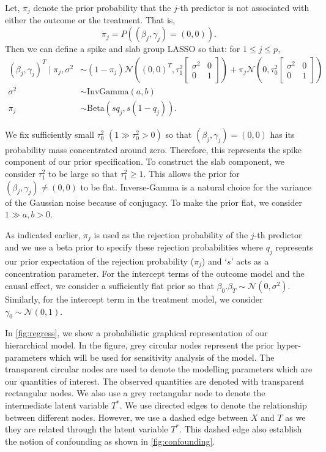 \documentclass{amsart}
\newcommand{\normal}{\mathcal{N}}
\begin{document}
Let, $\pi_j$ denote the prior probability that the $j$-th
predictor is not associated with either the outcome or the 
treatment. That is, 
\begin{equation}
	\pi_j = P\left((\beta_j,\gamma_j)=(0,0)\right).
\end{equation}
Then we can define a spike and slab group LASSO so that:
for $1\le j\le p$,
\begin{align}
(\beta_j,\gamma_j)^T \mid \pi_{j}, \sigma^2 &\sim 
(1-\pi_{j})\normal\left( (0,0)^T, 
\tau_1^2\begin{bmatrix}
\sigma^2 & 0 \\
0 & 1
\end{bmatrix}\right)
+ \pi_{j} \normal\left(0, 
\tau_0^2\begin{bmatrix}
\sigma^2 & 0 \\
0 & 1
\end{bmatrix}\right)\\
\sigma^2&\sim \text{InvGamma}(a, b)\\
\pi_{j} &\sim\text{Beta}\left(sq_j, s(1-q_j)\right).
\end{align}

We fix sufficiently small $\tau^2_0$
$(1\gg\tau_0^2>0)$ so that  $(\beta_j, \gamma_j) = (0,0)$ has its probability mass 
concentrated around zero. Therefore, this represents the spike component of our prior specification. 
To construct the slab component, we consider $\tau_1^2$ to be large so that $\tau_1^2\ge 1$. This allows the prior for $(\beta_j, \gamma_j)\not=(0,0)$ to be flat. Inverse-Gamma is a natural choice
for the variance of the Gaussian noise because of conjugacy. To
make the prior flat, we consider $1\gg a, b >0$.

As indicated earlier, $\pi_j$ is used as the rejection probability
of the $j$-th predictor and we use a beta prior to specify 
these rejection probabilities where  $q_j$ represents our prior expectation of the rejection probability ($\pi_j$) and `$s$' acts as 
a concentration parameter.
For the intercept terms of the outcome model and the causal effect, 
we consider a sufficiently flat prior so that 
$\beta_0. \beta_T\sim \normal(0,\sigma^2)$. Similarly, for the
intercept term in the treatment model, we consider 
$\gamma_0\sim \normal(0,1)$. 

In \cref{fig:regress}, we show a probabilistic graphical representation
of our hierarchical model. In the figure, grey circular nodes represent the
prior hyper-parameters which will be used for sensitivity analysis
of the model. The transparent circular nodes are used to denote
the modelling parameters which are our quantities of interest. 
The observed quantities are denoted with transparent rectangular
nodes. We also use a grey rectangular node to denote the intermediate
latent variable $T^*$. We use directed edges to denote the
relationship between different nodes. However, we use a dashed
edge between $X$ and $T$ as we they are related through the latent
variable $T^*$. This dashed edge also establish the notion of
confounding as shown in \cref{fig:confounding}.
\end{document}
